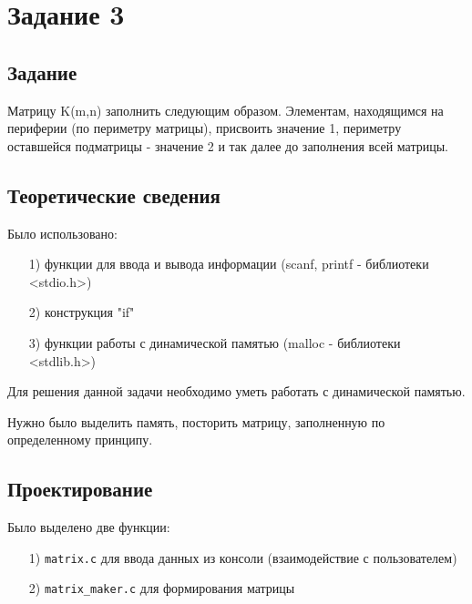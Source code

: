 \documentclass[12pt,a4paper]{report}
\begin{document}
\section{Задание 3}

\subsection{Задание}

Матрицу K(m,n) заполнить следующим образом. Элементам, находящимся на периферии (по периметру матрицы), присвоить значение 1, периметру оставшейся подматрицы - значение 2 и так далее до заполнения всей матрицы.

\subsection{Теоретические сведения}

Было использовано:
\begin{enumerate}
\item[1)] функции для ввода и вывода информации (scanf, printf - библиотеки <stdio.h>)
\item[2)] конструкция "if"
\item[3)] функции работы с динамической памятью (malloc - библиотеки <stdlib.h>)
\end{enumerate}

Для решения данной задачи необходимо уметь работать с динамической памятью.

Нужно было выделить память, посторить матрицу, заполненную по определенному принципу.

\subsection{Проектирование}

Было выделено две функции:
\begin{enumerate}
\item[1)] \verb-matrix.c- для ввода данных из консоли (взаимодействие с пользователем)
\item[2)] \verb-matrix_maker.c- для формирования матрицы
\end{enumerate}
\end{document}

